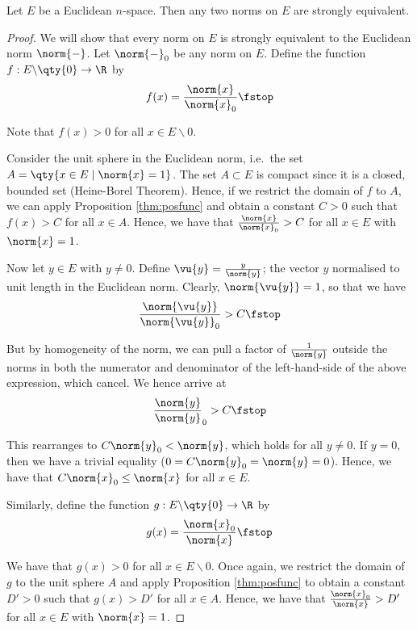  \begin{theorem}
   \label{thm:norm-equiv}
   Let \( E \) be a Euclidean \( n \)-space. Then any two norms on \( E \) are strongly equivalent.
 \end{theorem}
 \begin{proof}
   We will show that every norm on \( E \) is strongly equivalent to the Euclidean norm \( \norm{-} \). Let \( \norm{-}_0 \) be any norm on \( E \). Define the function \( f:E\backslash\qty{0}\to\R \) by
   \[ f(x)=\frac{\norm{x}}{\norm{x}_0}\fstop \]

   Note that \( f(x)>0 \) for all \( x\in E\backslash\qty{0} \).

   \vspace{3mm}
   
   Consider the unit sphere in the Euclidean norm, i.e.\ the set \( A=\qty{x\in E\mid\norm{x}=1} \). The set \( A\subset E \) is compact since it is a closed, bounded set (Heine-Borel Theorem). Hence, if we restrict the domain of \( f \) to \( A \), we can apply Proposition \ref{thm:posfunc} and obtain a constant \( C>0 \) such that \( f(x)>C \) for all \( x\in A \). Hence, we have that \( \frac{\norm{x}}{\norm{x}_0}>C \) for all \( x\in E \) with \( \norm{x}=1 \).

   \vspace{3mm}

   Now let \( y\in E \) with \( y\neq 0 \). Define \( \vu{y}=\frac{y}{\norm{y}} \); the vector \( y \) normalised to unit length in the Euclidean norm. Clearly, \( \norm{\vu{y}}=1 \), so that we have
   \[ \frac{\norm{\vu{y}}}{\norm{\vu{y}}_0}>C\fstop \]
   
   But by homogeneity of the norm, we can pull a factor of \( \frac{1}{\norm{y}} \) outside the norms in both the numerator and denominator of the left-hand-side of the above expression, which cancel. We hence arrive at
   \[ \frac{\norm{y}}{\norm{y}}_0>C\fstop \]

   This rearranges to \( C\norm{y}_0<\norm{y} \), which holds for all \( y\neq 0 \). If \( y=0 \), then we have a trivial equality (\( 0=C\norm{y}_0=\norm{y}=0 \)). Hence, we have that \( C\norm{x}_0\leq\norm{x} \) for all \( x\in E \).

   \vspace{3mm}

   Similarly, define the function \( g:E\backslash\qty{0}\to\R \) by
   \[ g(x)=\frac{\norm{x}_0}{\norm{x}}\fstop \]

   We have that \( g(x)>0 \) for all \( x\in E\backslash\qty{0} \). Once again, we restrict the domain of \( g \) to the unit sphere \( A \) and apply Proposition \ref{thm:posfunc} to obtain a constant \( D'>0 \) such that \( g(x)>D' \) for all \( x\in A \). Hence, we have that \( \frac{\norm{x}_0}{\norm{x}}>D' \) for all \( x\in E \) with \( \norm{x}=1 \).


\end{proof}
